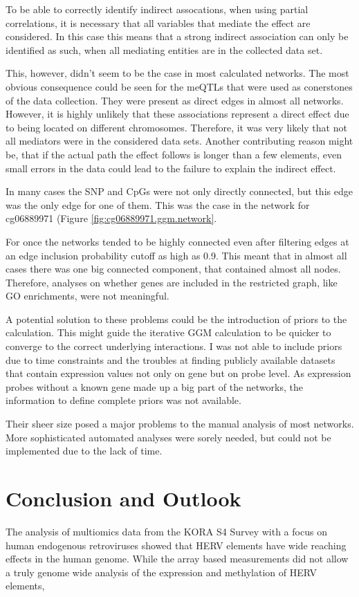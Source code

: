 \documentclass[a4paper,12pt,twoside,openright]{article}
\let\oldsection\section
\def\section{\cleardoublepage\oldsection}
\begin{document}
To be able to correctly identify indirect assocations, when using partial correlations, it is necessary that all variables that mediate the effect are considered. In this case this means that a strong indirect association can only be identified as such, when all mediating entities are in the collected data set. 

This, however, didn't seem to be the case in most calculated networks. The most obvious consequence could be seen for the meQTLs that were used as conerstones of the data collection. They were present as direct edges in almost all networks. However, it is highly  unlikely that these associations represent a direct effect due to being located on different chromosomes. Therefore, it was very likely that not all mediators were in the considered data sets. Another contributing reason might be, that if the actual path the effect follows is longer than a few elements, even small errors in the data could lead to the failure to explain the indirect effect. 

In many cases the SNP and CpGs were not only directly connected, but this edge was the only edge for one of them. This was the case in the network for cg06889971 (Figure \ref{fig:cg06889971.ggm.network}.

For once the networks tended to be highly connected even after filtering edges at an edge inclusion probability cutoff as high as 0.9. This meant that in almost all cases there was one big connected component, that contained almost all nodes. Therefore, analyses on whether genes are included in the restricted graph, like GO enrichments, were not meaningful. 

A potential solution to these problems could be the introduction of priors to the calculation. This might guide the iterative GGM calculation to be quicker to converge to the correct underlying interactions. I was not able to include priors due to time constraints and the troubles at finding publicly available datasets that contain expression values not only on gene but on probe level. As expression probes without a known gene made up a big part of the networks, the information to define complete priors was not available. 

Their sheer size posed a major problems to the manual analysis of most networks. More sophisticated automated analyses were sorely needed, but could not be implemented due to the lack of time. 


\newpage
\section{Conclusion and Outlook}
\label{Conclusion and Outlook}
The analysis of multiomics data from the KORA S4 Survey with a focus on human endogenous retroviruses showed that HERV elements have wide reaching effects in the human genome. While the array based measurements did not allow a truly genome wide analysis of the expression and methylation of HERV elements, 

\newpage
\listoffigures
\listoftables

{}

\end{document}
